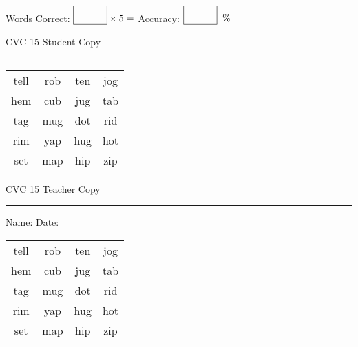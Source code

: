 \documentclass{memoir}
\begin{document}
\normalsize

Words Correct: $\fbox{\phantom{\huge 100}} \times 5 = $ Accuracy: $\fbox{\phantom{\huge 100}}\;\; \%$ 

\vfill

\newpage


\footnotesize \noindent
CVC 15 \hfill Student Copy
\smallskip
\hrule

\huge

\setlength{\tabcolsep}{14pt}
\def\arraystretch{2}

{\selectfont


\begin{vplace}[0.5]
\begin{center}
\begin{tabular}{cccc}
tell & rob & ten & jog \\
hem & cub & jug & tab \\
tag & mug & dot & rid \\
rim & yap & hug & hot \\
set & map & hip & zip \\
\end{tabular}
\end{center}
\end{vplace}

}

\newpage

\footnotesize \noindent
CVC 15 \hfill Teacher Copy
\smallskip
\hrule

\normalsize

\vfill

\noindent
Name: \underline{\hspace{1.75in}} \hfill Date: \underline{\hspace{1in}}

\huge

{\selectfont


\begin{vplace}[0.5]
\begin{center}
\begin{tabular}{cccc}
tell & rob & ten & jog \\
hem & cub & jug & tab \\
tag & mug & dot & rid \\
rim & yap & hug & hot \\
set & map & hip & zip \\
\end{tabular}
\end{center}
\end{vplace}



}
\end{document}
